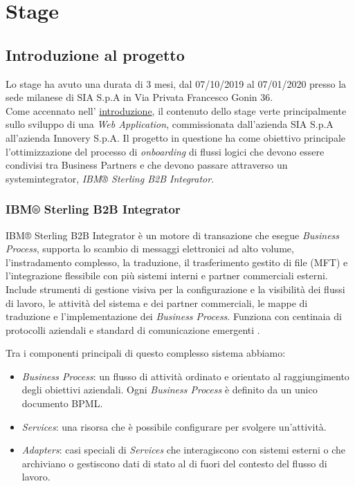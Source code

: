 \chapter{Stage}
\label{chap:stage}


\section{Introduzione al progetto}
\label{sec:introstage}
Lo stage ha avuto una durata di 3 mesi, dal 07/10/2019 al 07/01/2020 presso la sede milanese di SIA S.p.A in Via Privata Francesco Gonin 36. \\

Come accennato nell' \hyperlink{introduzione}{introduzione}, il contenuto dello stage verte principalmente sullo sviluppo di una \textit{Web Application}, commissionata dall'azienda SIA S.p.A all'azienda Innovery S.p.A.
Il progetto in questione ha come obiettivo principale l'ottimizzazione del processo di \textit{onboarding} di flussi logici che devono essere condivisi tra Business Partners e che devono passare attraverso un \gls{systemintegrator}, \textit{IBM® Sterling B2B Integrator}. \\

\subsection{IBM® Sterling B2B Integrator}
IBM® Sterling B2B Integrator è un motore di transazione che esegue \textit{Business Process}, supporta lo scambio di messaggi elettronici ad alto volume, l'instradamento complesso, la traduzione, il trasferimento gestito di file (\gls{MFT}) e l'integrazione flessibile con più sistemi interni e partner commerciali esterni. Include strumenti di gestione visiva per la configurazione e la visibilità dei flussi di lavoro, le attività del sistema e dei partner commerciali, le mappe di traduzione e l'implementazione dei \textit{Business Process}. Funziona con centinaia di protocolli aziendali e standard di comunicazione emergenti \cite{ibmsterling}.

Tra i componenti principali di questo complesso sistema abbiamo:
\begin{itemize}
    \item \textit{Business Process}: un flusso di attività ordinato e orientato al raggiungimento degli obiettivi aziendali. Ogni \textit{Business Process} è definito da un unico documento \gls{BPML}.
    \item \textit{Services}: una risorsa che è possibile configurare per svolgere un'attività. 
    \item \textit{Adapters}: casi speciali di \textit{Services} che interagiscono con sistemi esterni o che archiviano o gestiscono dati di stato al di fuori del contesto del flusso di lavoro.
\end{itemize}



